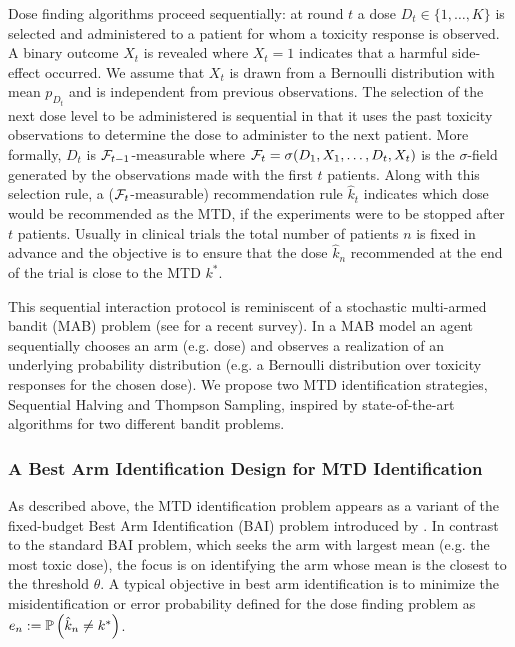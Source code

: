 Dose finding algorithms proceed sequentially: at round $t$ a dose $D_t \in \{1,\dots,K\}$ is selected and administered to a patient for whom a toxicity response is observed. A binary outcome $X_t$ is revealed where $X_t = 1$ indicates that a harmful side-effect occurred.
We assume that $X_t$ is drawn from a Bernoulli distribution with mean $p_{D_t}$ and is independent from previous observations. The selection of the next dose level to be administered is sequential in that it uses the past toxicity observations to determine the dose to administer to the next patient. More formally, $D_t$ is $\mathcal{F}_{t-1}$-measurable where $\mathcal{F}_t= \sigma(D_1,X_1,\dots,D_t,X_t)$ is the $\sigma$-field generated by the observations made with the first $t$ patients. Along with this selection rule, a ($\mathcal{F}_{t}$-measurable) recommendation rule $\hat{k}_t$ indicates which dose would be recommended as the MTD, if the experiments were to be stopped after $t$ patients. Usually in clinical trials the total number of patients $n$ is fixed in advance and the objective is to ensure that the dose $\hat{k}_n$ recommended at the end of the trial is close to the MTD $k^*$. 

This sequential interaction protocol is reminiscent of a stochastic multi-armed bandit (MAB) problem (see \cite{Bubeck:Survey12} for a recent survey). In a MAB model an agent sequentially chooses an arm (e.g. dose) and observes a realization of an underlying probability distribution (e.g. a Bernoulli distribution over toxicity responses for the chosen dose). We propose two MTD identification strategies, Sequential Halving and Thompson Sampling, inspired by state-of-the-art algorithms for two different bandit problems.  

\subsubsection{A Best Arm Identification Design for MTD Identification}

As described above, the MTD identification problem appears as a variant of the fixed-budget Best Arm Identification (BAI) problem introduced by \cite{Bubeck10BestArm,Bubeckal11}. In contrast to the standard BAI problem, which seeks the arm with largest mean (e.g. the most toxic dose), the focus is on identifying the arm whose mean is the closest to the threshold $\theta$. 
A typical objective in best arm identification is to minimize the misidentification or error probability defined for the dose finding problem as $e_n := \mathbb{P}\left(\hat{k}_n \neq k^*\right)$.

